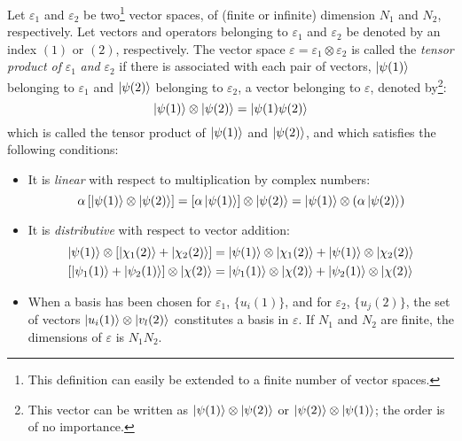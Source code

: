 \begin{definition}
    Let $\varepsilon_1$ and $\varepsilon_2$ be two\footnote{This definition can easily be extended to a finite number of vector spaces.} vector spaces, of (finite or infinite) dimension $N_1$ and $N_2$, respectively. Let vectors and operators belonging to $\varepsilon_1$ and $\varepsilon_2$ be denoted by an index $(1)$ or $(2)$, respectively. The vector space $\varepsilon = \varepsilon_1 \otimes \varepsilon_2$ is called the \textit{tensor product of} $\varepsilon_1$ \textit{and} $\varepsilon_2$ if there is associated with each pair of vectors, $\ket{\psi(1)}$ belonging to $\varepsilon_1$ and $\ket{\psi(2)}$ belonging to $\varepsilon_2$, a vector belonging to $\varepsilon$, denoted by\footnote{This vector can be written as $\ket{\psi(1)}\otimes\ket{\psi(2)}$ or $\ket{\psi(2)}\otimes\ket{\psi(1)}$; the order is of no importance.}:
    \begin{equation}
        \ket{\psi(1)}\otimes\ket{\psi(2)} = \ket{\psi(1)\psi(2)} 
    \end{equation}
    which is called the tensor product of $\ket{\psi(1)}$ and $\ket{\psi(2)}$, and which satisfies the following conditions:
    \begin{itemize}
        \item It is \textit{linear} with respect to multiplication by complex numbers:
        \begin{equation}
            \alpha\left[\ket{\psi(1)}\otimes\ket{\psi(2)}\right] = \left[\alpha\ket{\psi(1)}\right]\otimes\ket{\psi(2)} = \ket{\psi(1)}\otimes(\alpha\ket{\psi(2)})
        \end{equation}
        \item It is \textit{distributive} with respect to vector addition:
        \begin{equation}
            \begin{split}
                \ket{\psi(1)}\otimes \left[\ket{\chi_1(2)} + \ket{\chi_2(2)}\right] &= \ket{\psi(1)}\otimes\ket{\chi_1(2)} + \ket{\psi(1)}\otimes\ket{\chi_2(2)}\\
                \left[\ket{\psi_1(1)} + \ket{\psi_2(1)}\right]\otimes\ket{\chi(2)} &= \ket{\psi_1(1)}\otimes\ket{\chi(2)} + \ket{\psi_2(1)}\otimes\ket{\chi(2)}   
            \end{split}
        \end{equation}
        \item When a basis has been chosen for $\varepsilon_1$, $\{u_i(1)\}$, and for $\varepsilon_2$, $\{u_j(2)\}$, the set of vectors $\ket{u_i(1)}\otimes\ket{v_l(2)}$ constitutes a basis in $\varepsilon$. If $N_1$ and $N_2$ are finite, the dimensions of $\varepsilon$ is $N_1N_2$.
    \end{itemize}
\end{definition}

